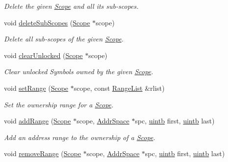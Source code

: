 \begin{DoxyCompactItemize}
\begin{DoxyCompactList}\small\item\em Delete the given \mbox{\hyperlink{class_scope}{Scope}} and all its sub-\/scopes. \end{DoxyCompactList}\item 
void \mbox{\hyperlink{class_database_a7fcfc328de0a3f2d4ec8abdd6428213a}{delete\+Sub\+Scopes}} (\mbox{\hyperlink{class_scope}{Scope}} $\ast$scope)
\begin{DoxyCompactList}\small\item\em Delete all sub-\/scopes of the given \mbox{\hyperlink{class_scope}{Scope}}. \end{DoxyCompactList}\item 
void \mbox{\hyperlink{class_database_ab7749ce6cebbb4f7520baa7a6177ab33}{clear\+Unlocked}} (\mbox{\hyperlink{class_scope}{Scope}} $\ast$scope)
\begin{DoxyCompactList}\small\item\em Clear unlocked Symbols owned by the given \mbox{\hyperlink{class_scope}{Scope}}. \end{DoxyCompactList}\item 
void \mbox{\hyperlink{class_database_ac4397e487146864510d89c9e3d12a2a7}{set\+Range}} (\mbox{\hyperlink{class_scope}{Scope}} $\ast$scope, const \mbox{\hyperlink{class_range_list}{Range\+List}} \&rlist)
\begin{DoxyCompactList}\small\item\em Set the {\itshape ownership} range for a \mbox{\hyperlink{class_scope}{Scope}}. \end{DoxyCompactList}\item 
void \mbox{\hyperlink{class_database_a3ad165aa6ec64f417376669625d31c69}{add\+Range}} (\mbox{\hyperlink{class_scope}{Scope}} $\ast$scope, \mbox{\hyperlink{class_addr_space}{Addr\+Space}} $\ast$spc, \mbox{\hyperlink{types_8h_a2db313c5d32a12b01d26ac9b3bca178f}{uintb}} first, \mbox{\hyperlink{types_8h_a2db313c5d32a12b01d26ac9b3bca178f}{uintb}} last)
\begin{DoxyCompactList}\small\item\em Add an address range to the {\itshape ownership} of a \mbox{\hyperlink{class_scope}{Scope}}. \end{DoxyCompactList}\item 
void \mbox{\hyperlink{class_database_a4db50bb44cfc56d4102f102c0ddbf423}{remove\+Range}} (\mbox{\hyperlink{class_scope}{Scope}} $\ast$scope, \mbox{\hyperlink{class_addr_space}{Addr\+Space}} $\ast$spc, \mbox{\hyperlink{types_8h_a2db313c5d32a12b01d26ac9b3bca178f}{uintb}} first, \mbox{\hyperlink{types_8h_a2db313c5d32a12b01d26ac9b3bca178f}{uintb}} last)

\end{DoxyCompactItemize}
